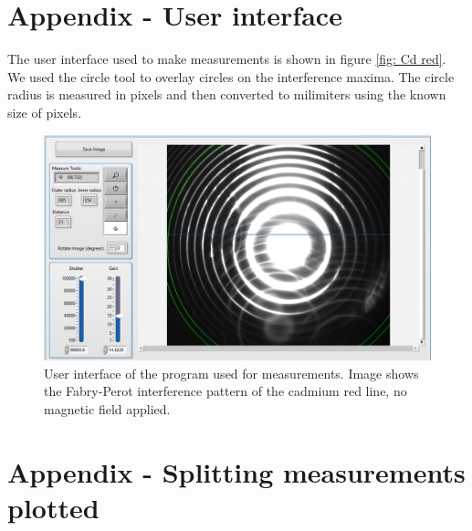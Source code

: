\documentclass[11pt]{article}
\begin{document}
\section{Appendix - User interface}
The user interface used to make measurements is shown in figure \ref{fig: Cd red}. We used the circle tool to overlay circles on the interference maxima. The circle radius is measured in pixels and then converted to milimiters using the known size of pixels. 

\begin{figure}[h!]
    \centering
    \includegraphics[width=0.65\linewidth]{d measurement.png}
    \captionsetup{justification=centering}
    \caption{User interface of the program used for measurements. Image shows the Fabry-Perot interference pattern of the cadmium red line, no magnetic field applied.}
    \label{fig: d measurement}
\end{figure}

\newpage

\section{Appendix - Splitting measurements plotted}
\end{document}
